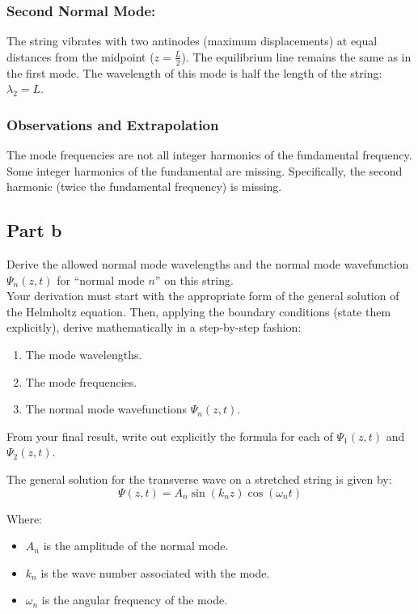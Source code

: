 \documentclass{article}
\newcommand{\pregunta}[1]{\begin{note}#1\end{note}}
\begin{document}
\subsubsection*{Second Normal Mode:}
    The string vibrates with two antinodes (maximum displacements) at equal distances from the midpoint (\(z = \frac{L}{2}\)). The equilibrium line remains the same as in the first mode. The wavelength of this mode is half the length of the string: \(\lambda_2 = L\).

\subsubsection*{Observations and Extrapolation}
    The mode frequencies are not all integer harmonics of the fundamental frequency. Some integer harmonics of the fundamental are missing. Specifically, the second harmonic (twice the fundamental frequency) is missing.

\subsection*{Part b}
\pregunta{
Derive the allowed normal mode wavelengths and the normal mode wavefunction \(\Psi_n(z,t)\) for “normal mode \(n\)” on this string.\\

\noindent Your derivation must start with the appropriate form of the general solution of the Helmholtz equation. Then, applying the boundary conditions (state them explicitly), derive mathematically in a step-by-step fashion:
\begin{enumerate}
    \item The mode wavelengths.
    \item The mode frequencies.
    \item The normal mode wavefunctions \(\Psi_n(z,t)\).
\end{enumerate}

From your final result, write out explicitly the formula for each of \(\Psi_1(z,t)\) and \(\Psi_2(z,t)\).}

The general solution for the transverse wave on a stretched string is given by:
\[ \Psi(z, t) = A_n \sin(k_n z) \cos(\omega_n t) \]

Where:
\begin{itemize}
    \item \(A_n\) is the amplitude of the normal mode.
    \item \(k_n\) is the wave number associated with the mode.
    \item \(\omega_n\) is the angular frequency of the mode.
\end{itemize}
\end{document}
